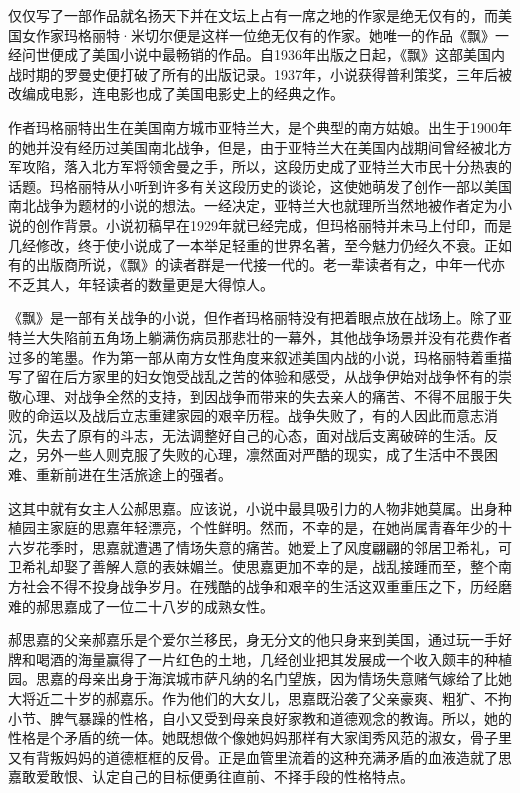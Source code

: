 \par 仅仅写了一部作品就名扬天下并在文坛上占有一席之地的作家是绝无仅有的，而美国女作家玛格丽特·米切尔便是这样一位绝无仅有的作家。她唯一的作品《飘》一经问世便成了美国小说中最畅销的作品。自1936年出版之日起，《飘》这部美国内战时期的罗曼史便打破了所有的出版记录。1937年，小说获得普利策奖，三年后被改编成电影，连电影也成了美国电影史上的经典之作。
\par 作者玛格丽特出生在美国南方城市亚特兰大，是个典型的南方姑娘。出生于1900年的她并没有经历过美国南北战争，但是，由于亚特兰大在美国内战期间曾经被北方军攻陷，落入北方军将领舍曼之手，所以，这段历史成了亚特兰大市民十分热衷的话题。玛格丽特从小听到许多有关这段历史的谈论，这使她萌发了创作一部以美国南北战争为题材的小说的想法。一经决定，亚特兰大也就理所当然地被作者定为小说的创作背景。小说初稿早在1929年就已经完成，但玛格丽特并未马上付印，而是几经修改，终于使小说成了一本举足轻重的世界名著，至今魅力仍经久不衰。正如有的出版商所说，《飘》的读者群是一代接一代的。老一辈读者有之，中年一代亦不乏其人，年轻读者的数量更是大得惊人。
\par 《飘》是一部有关战争的小说，但作者玛格丽特没有把着眼点放在战场上。除了亚特兰大失陷前五角场上躺满伤病员那悲壮的一幕外，其他战争场景并没有花费作者过多的笔墨。作为第一部从南方女性角度来叙述美国内战的小说，玛格丽特着重描写了留在后方家里的妇女饱受战乱之苦的体验和感受，从战争伊始对战争怀有的崇敬心理、对战争全然的支持，到因战争而带来的失去亲人的痛苦、不得不屈服于失败的命运以及战后立志重建家园的艰辛历程。战争失败了，有的人因此而意志消沉，失去了原有的斗志，无法调整好自己的心态，面对战后支离破碎的生活。反之，另外一些人则克服了失败的心理，凛然面对严酷的现实，成了生活中不畏困难、重新前进在生活旅途上的强者。
\par 这其中就有女主人公郝思嘉。应该说，小说中最具吸引力的人物非她莫属。出身种植园主家庭的思嘉年轻漂亮，个性鲜明。然而，不幸的是，在她尚属青春年少的十六岁花季时，思嘉就遭遇了情场失意的痛苦。她爱上了风度翩翩的邻居卫希礼，可卫希礼却娶了善解人意的表妹媚兰。使思嘉更加不幸的是，战乱接踵而至，整个南方社会不得不投身战争岁月。在残酷的战争和艰辛的生活这双重重压之下，历经磨难的郝思嘉成了一位二十八岁的成熟女性。
\par 郝思嘉的父亲郝嘉乐是个爱尔兰移民，身无分文的他只身来到美国，通过玩一手好牌和喝酒的海量赢得了一片红色的土地，几经创业把其发展成一个收入颇丰的种植园。思嘉的母亲出身于海滨城市萨凡纳的名门望族，因为情场失意赌气嫁给了比她大将近二十岁的郝嘉乐。作为他们的大女儿，思嘉既沿袭了父亲豪爽、粗犷、不拘小节、脾气暴躁的性格，自小又受到母亲良好家教和道德观念的教诲。所以，她的性格是个矛盾的统一体。她既想做个像她妈妈那样有大家闺秀风范的淑女，骨子里又有背叛妈妈的道德框框的反骨。正是血管里流着的这种充满矛盾的血液造就了思嘉敢爱敢恨、认定自己的目标便勇往直前、不择手段的性格特点。
